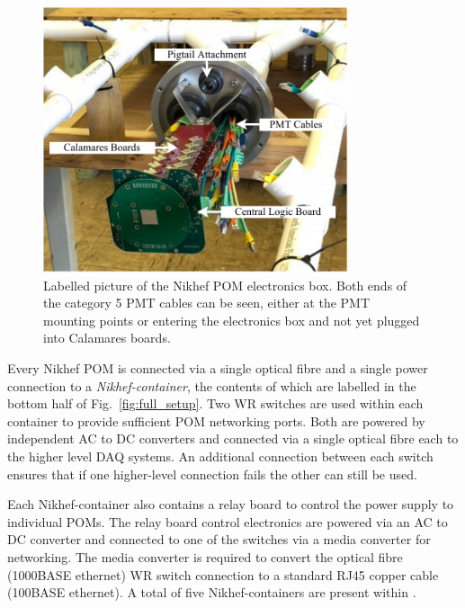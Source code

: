 \begin{figure} %
    \includegraphics[width=0.8\textwidth]{diagrams/5-daq/nikhef_plane.pdf}
    \caption[Labelled picture of the Nikhef POM electronics box.]
    {Labelled picture of the Nikhef POM electronics box. Both ends of the category 5 PMT cables
        can be seen, either at the PMT mounting points or entering the electronics box and not yet
        plugged into Calamares boards.}
    \label{fig:nikhef_plane}
\end{figure}

Every Nikhef POM is connected via a single optical fibre and a single power connection to a
\emph{Nikhef-container}, the contents of which are labelled in the bottom half of
Fig.~\ref{fig:full_setup}. Two WR switches are used within each container to provide sufficient
POM networking ports. Both are powered by independent AC to DC converters and connected via a
single optical fibre each to the higher level DAQ systems. An additional connection between each
switch ensures that if one higher-level connection fails the other can still be used.

Each Nikhef-container also contains a relay board to control the power supply to individual POMs.
The relay board control electronics are powered via an AC to DC converter and connected to one of
the switches via a media converter for networking. The media converter is required to convert the
optical fibre (1000BASE ethernet) WR switch connection to a standard RJ45 copper cable (100BASE
ethernet). A total of five Nikhef-containers are present within \chipsfive.

